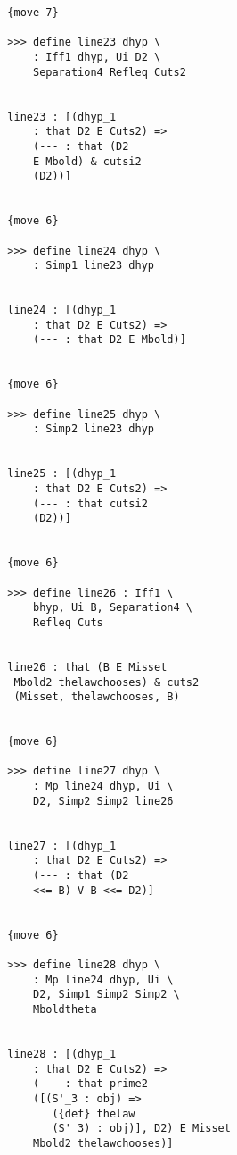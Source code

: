 \documentclass[12pt]{article}
\begin{document}
\begin{verbatim}
                     {move 7}

                     >>> define line23 dhyp \
                         : Iff1 dhyp, Ui D2 \
                         Separation4 Refleq Cuts2


                     line23 : [(dhyp_1 
                         : that D2 E Cuts2) => 
                         (--- : that (D2 
                         E Mbold) & cutsi2 
                         (D2))]


                     {move 6}

                     >>> define line24 dhyp \
                         : Simp1 line23 dhyp


                     line24 : [(dhyp_1 
                         : that D2 E Cuts2) => 
                         (--- : that D2 E Mbold)]


                     {move 6}

                     >>> define line25 dhyp \
                         : Simp2 line23 dhyp


                     line25 : [(dhyp_1 
                         : that D2 E Cuts2) => 
                         (--- : that cutsi2 
                         (D2))]


                     {move 6}

                     >>> define line26 : Iff1 \
                         bhyp, Ui B, Separation4 \
                         Refleq Cuts


                     line26 : that (B E Misset 
                      Mbold2 thelawchooses) & cuts2 
                      (Misset, thelawchooses, B)


                     {move 6}

                     >>> define line27 dhyp \
                         : Mp line24 dhyp, Ui \
                         D2, Simp2 Simp2 line26


                     line27 : [(dhyp_1 
                         : that D2 E Cuts2) => 
                         (--- : that (D2 
                         <<= B) V B <<= D2)]


                     {move 6}

                     >>> define line28 dhyp \
                         : Mp line24 dhyp, Ui \
                         D2, Simp1 Simp2 Simp2 \
                         Mboldtheta


                     line28 : [(dhyp_1 
                         : that D2 E Cuts2) => 
                         (--- : that prime2 
                         ([(S'_3 : obj) => 
                            ({def} thelaw 
                            (S'_3) : obj)], D2) E Misset 
                         Mbold2 thelawchooses)]



\end{verbatim}
\end{document}
